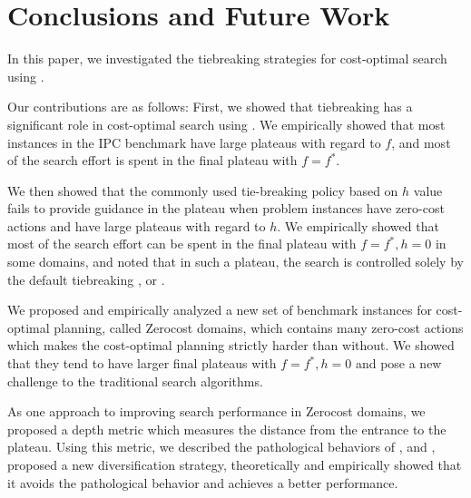 
\section{Conclusions and Future Work}

In this paper, we investigated the tiebreaking strategies for cost-optimal search using \astar.  
\begin{comment} %
We sought to (1) shed some light on the importance of tiebreaking in \astar,  %
(2) improve \astar without modifying its main heuristic function at all, and (3) to
improve \astar by introducing inadmissible techniques. We reached all of these goals successfully: We sought
various possible enhancements and achieved significant performance improvements solely by the tiebreaking
techniques. In detail, the contributions in this paper are the following:
\end{comment}
Our contributions are as follows:
 First, we showed that tiebreaking has a significant role in cost-optimal
       search using \astar. We empirically showed that most instances in the IPC
       benchmark have large plateaus with regard to $f$, and most of the
       search effort is spent in the final plateau with $f=f^*$.

 We then showed that  the commonly used tie-breaking policy based on $h$ value fails to
       provide guidance in the plateau when problem instances have zero-cost
       actions and have large plateaus with regard to $h$.
       We empirically showed that most of the search effort can be spent in
       the final plateau with $f=f^*, h=0$ in some domains, and noted that in such
       a plateau, the search is controlled solely by the
       default tiebreaking \fifo, \lifo or \ro.

 We proposed and empirically analyzed a new set of benchmark instances for cost-optimal planning, called Zerocost
 domains, which contains many zero-cost actions which makes the cost-optimal planning strictly harder than without.
       We showed that they tend to have larger final plateaus with $f=f^*, h=0$ and pose a new challenge to the traditional search algorithms.

 As one approach to improving search performance in Zerocost domains, we proposed a depth metric
       which measures the distance from the entrance to the
       plateau. Using this metric, we described the pathological
       behaviors of \fifo, \lifo and \ro, proposed a new diversification
       strategy, theoretically and empirically showed that it avoids the
       pathological behavior and achieves a better performance.

